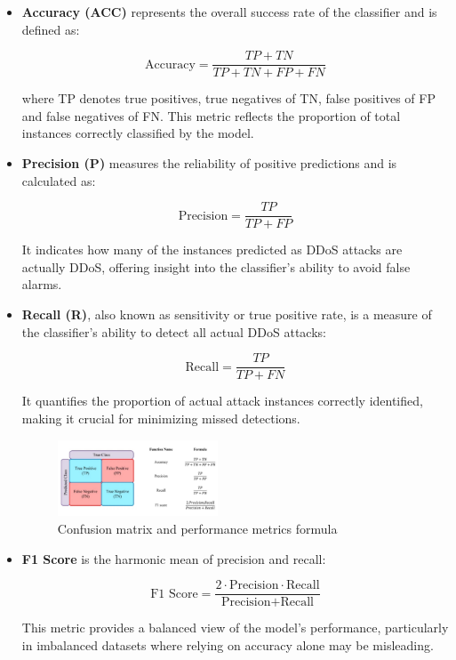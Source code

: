 \documentclass[conference]{IEEEtran}
\begin{document}
\begin{itemize}
    \item \textbf{Accuracy (ACC)} represents the overall success rate of the classifier and is defined as:

    \[
    \text{Accuracy} = \frac{TP + TN}{TP + TN + FP + FN}
    \]

    where TP denotes true positives, true negatives of TN, false positives of FP and false negatives of FN. This metric reflects the proportion of total instances correctly classified by the model.

    \item \textbf{Precision (P)} measures the reliability of positive predictions and is calculated as:

    \[
    \text{Precision} = \frac{TP}{TP + FP}
    \]

    It indicates how many of the instances predicted as DDoS attacks are actually DDoS, offering insight into the classifier’s ability to avoid false alarms.
    

    \item \textbf{Recall (R)}, also known as sensitivity or true positive rate, is a measure of the classifier’s ability to detect all actual DDoS attacks:

    \[
    \text{Recall} = \frac{TP}{TP + FN}
    \]

    It quantifies the proportion of actual attack instances correctly identified, making it crucial for minimizing missed detections.
\begin{figure}[htbp]
\centerline{\includegraphics[width=0.45\textwidth]{ConfussionMatrix.JPG}}
\caption{Confusion matrix and performance metrics formula}
\label{fig:ConfusionFormula}
\end{figure}
    \item \textbf{F1 Score} is the harmonic mean of precision and recall:

    \[
    \text{F1 Score} = \frac{2 \cdot \text{Precision} \cdot \text{Recall}}{\text{Precision} + \text{Recall}}
    \]

    This metric provides a balanced view of the model’s performance, particularly in imbalanced datasets where relying on accuracy alone may be misleading.


\end{itemize}
\end{document}
